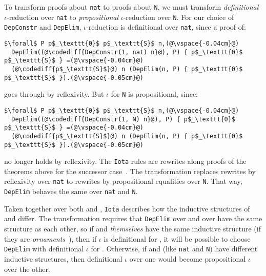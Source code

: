 To transform proofs about \lstinline{nat} to proofs about \lstinline{N}, we must transform \textit{definitional} $\iota$-reduction over \lstinline{nat} to \textit{propositional} $\iota$-reduction over \lstinline{N}.
For our choice of \lstinline{DepConstr} and \lstinline{DepElim},
$\iota$-reduction is definitional over \lstinline{nat}, since a proof of:\vspace{-0.01cm}

\begin{lstlisting}
$\forall$ P p$_\texttt{0}$ p$_\texttt{S}$ n,(@\vspace{-0.04cm}@)
  DepElim((@\codediff{DepConstr(1, nat) n}@), P) { p$_\texttt{0}$ p$_\texttt{S}$ } =(@\vspace{-0.04cm}@)
  (@\codediff{p$_\texttt{S}$}@) n (DepElim(n, P) { p$_\texttt{0}$ p$_\texttt{S}$ }).(@\vspace{-0.05cm}@)
\end{lstlisting}
goes through by reflexivity.
But $\iota$ for \lstinline{N} is propositional, since:

\begin{lstlisting}
$\forall$ P p$_\texttt{0}$ p$_\texttt{S}$ n,(@\vspace{-0.04cm}@)
  DepElim((@\codediff{DepConstr(1, N) n}@), P) { p$_\texttt{0}$ p$_\texttt{S}$ } =(@\vspace{-0.04cm}@)
  (@\codediff{p$_\texttt{S}$}@) n (DepElim(n, P) { p$_\texttt{0}$ p$_\texttt{S}$ }).(@\vspace{-0.05cm}@)
\end{lstlisting}
no longer holds by reflexivity.
The \lstinline{Iota} rules are rewrites along proofs of the theorems above for the successor case~.
The transformation replaces rewrites by reflexivity over \lstinline{nat} to rewrites by propositional equalities over \lstinline{N}.
That way, \lstinline{DepElim} behaves the same over \lstinline{nat} and \lstinline{N}.

Taken together over both \A and \B, \lstinline{Iota} describes how the inductive structures of \A and \B differ.
The transformation requires that \lstinline{DepElim} over \A and over \B have the same structure
as each other, so if \A and \B \textit{themselves} have the same 
inductive structure (if they are \textit{ornaments}~\cite{mcbride}),
then if $\iota$ is definitional for \A, it will be possible to choose
\lstinline{DepElim} with definitional $\iota$ for \B.
Otherwise, if \A and \B (like \lstinline{nat} and \lstinline{N}) have different inductive structures,
then definitional $\iota$ over one would become propositional $\iota$ over the other.

